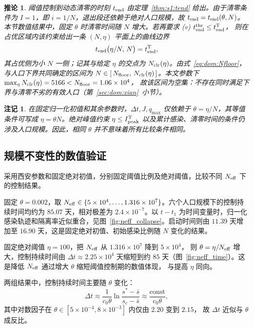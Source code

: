 \documentclass[lang=cn,a4paper,newtx]{elegantpaper}
\numberwithin{equation}{section}
\theoremstyle{plain}
\newtheorem{corollaryn}[theorem]{推论}
\newtheorem{remarkn}[theorem]{注记}
\begin{document}
\begin{corollaryn}\label{cor:clr}
阈值控制到动态清零的时刻 $t_{\rm end}$ 由定理~\ref{thm:s1:tend} 给出。由于清零条件为 $I=1$，即 $i=1/N$，退出段还依赖于绝对人口规模，故 $t_{\rm end}=t_{\rm end}(\theta,N)$。本节数值结果中，固定 $\theta$ 时清零时间随 $N$ 增大。若再要求
(v) $t_{\rm end}^{\rm thr}\le t_{\rm end}^{\rm T}$，
则在占优区域内该约束给出一条 $(N,\eta)$ 平面上的曲线边界
\begin{equation}
  t_{\rm end}\big(\eta/N,\,N\big)=t_{\rm end}^{\rm T},
  \label{eq:dom:clrarc}
\end{equation}
其占优侧为小 $N$ 一侧；记其与给定 $\eta$ 的交点为 $N_{\rm clr}(\eta)$。由式~\eqref{eq:dom:Nfloor}，
与人口下界共同确定的区间为 $N\in[\,N_{\rm floor},\,N_{\rm clr}(\eta)\,]$。本文参数下
$\max_\eta N_{\rm clr}(\eta)=5166<N_{\rm floor}=1.06\times10^{4}$，
故该区间为空集：不存在同时满足下界与清零不劣的有效人口（第~\ref{sec:dom:xian}~小节）。
\end{corollaryn}

\begin{remarkn}\label{rem:dom:dichotomy}
在固定归一化初值和其余参数时，$\Delta t,J,q_{\max}$ 仅依赖于 $\theta=\eta/N$，其等值条件可写成 $\eta=\theta N$。绝对峰值约束 $\eta\le I_{\rm peak}^{\rm T}$ 以及累计感染、清零时间的条件仍涉及人口规模。因此，相同 $\theta$ 并不意味着所有比较条件相同。
\end{remarkn}

\subsection{规模不变性的数值验证}
\label{sec:scaling}

采用西安参数和固定绝对初值，分别固定阈值比例及绝对阈值，比较不同 $N_{\rm eff}$ 下的控制结果。

固定 $\theta=0.002$，取 $N_{\rm eff}\in\{5\times10^4,\dots,1.316\times10^7\}$。六个人口规模下的控制持续时间均约为 $85.07$ 天，相对极差为 $2.4\times10^{-7}$。以 $t-t_1$ 为时间变量时，归一化感染轨迹和隔离率近似重合，见图~\ref{fig:neff_collapse}。启动时间则由 $11.39$ 天增加至 $16.90$ 天，这是固定绝对初值、初始感染比例随 $N$ 变化的结果。

固定绝对阈值 $\eta=100$，把 $N_{\rm eff}$ 从 $1.316\times10^7$ 降到 $5\times10^{4}$，
则 $\theta=\eta/N_{\rm eff}$ 增大，控制持续时间由 $\Delta t\approx2.25\times10^4$ 天缩短到约
$85$ 天（图~\ref{fig:neff_time}）。这是降低 $N_{\rm eff}$ 通过增大 $\theta$ 缩短阈值控制期的数值体现，
与提高 $\eta$ 同向。

两组结果中，控制持续时间主要随 $\theta$ 变化：
\[
\Delta t\approx\frac{1}{c_0\theta}\ln\frac{s^*-\bar s}{s_c-\bar s}\approx\frac{\text{const}}{c_0\theta},
\]
其中对数因子在 $\theta\in[5\times10^{-4},8\times10^{-3}]$ 内仅由 $2.20$ 变到 $2.15$，
故 $\Delta t$ 近似与 $\theta$ 成反比。
\end{document}

